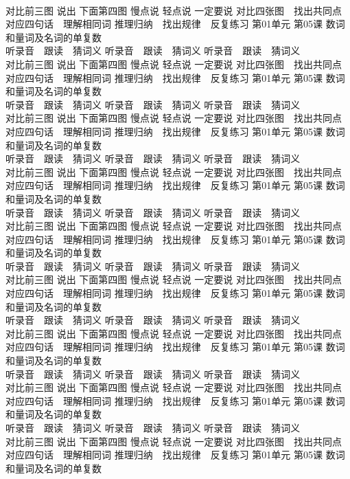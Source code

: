 \documentclass[8pt]{extreport}
\begin{document}
\begin{CJK}{UTF8}{min}
\\	对比前三图 说出 下面第四图 慢点说 轻点说 一定要说	对比四张图　找出共同点 对应四句话　理解相同词 推理归纳　找出规律　反复练习 第01单元 第05课 数词和量词及名词的单复数
\\	听录音　跟读　猜词义 听录音　跟读　猜词义 听录音　跟读　猜词义 
\\	对比前三图 说出 下面第四图 慢点说 轻点说 一定要说	对比四张图　找出共同点 对应四句话　理解相同词 推理归纳　找出规律　反复练习 第01单元 第05课 数词和量词及名词的单复数
\\	听录音　跟读　猜词义 听录音　跟读　猜词义 听录音　跟读　猜词义 
\\	对比前三图 说出 下面第四图 慢点说 轻点说 一定要说	对比四张图　找出共同点 对应四句话　理解相同词 推理归纳　找出规律　反复练习 第01单元 第05课 数词和量词及名词的单复数
\\	听录音　跟读　猜词义 听录音　跟读　猜词义 听录音　跟读　猜词义 
\\	对比前三图 说出 下面第四图 慢点说 轻点说 一定要说	对比四张图　找出共同点 对应四句话　理解相同词 推理归纳　找出规律　反复练习 第01单元 第05课 数词和量词及名词的单复数
\\	听录音　跟读　猜词义 听录音　跟读　猜词义 听录音　跟读　猜词义 
\\	对比前三图 说出 下面第四图 慢点说 轻点说 一定要说	对比四张图　找出共同点 对应四句话　理解相同词 推理归纳　找出规律　反复练习 第01单元 第05课 数词和量词及名词的单复数
\\	听录音　跟读　猜词义 听录音　跟读　猜词义 听录音　跟读　猜词义 
\\	对比前三图 说出 下面第四图 慢点说 轻点说 一定要说	对比四张图　找出共同点 对应四句话　理解相同词 推理归纳　找出规律　反复练习 第01单元 第05课 数词和量词及名词的单复数
\\	听录音　跟读　猜词义 听录音　跟读　猜词义 听录音　跟读　猜词义 
\\	对比前三图 说出 下面第四图 慢点说 轻点说 一定要说	对比四张图　找出共同点 对应四句话　理解相同词 推理归纳　找出规律　反复练习 第01单元 第05课 数词和量词及名词的单复数
\\	听录音　跟读　猜词义 听录音　跟读　猜词义 听录音　跟读　猜词义 
\\	对比前三图 说出 下面第四图 慢点说 轻点说 一定要说	对比四张图　找出共同点 对应四句话　理解相同词 推理归纳　找出规律　反复练习 第01单元 第05课 数词和量词及名词的单复数
\\	听录音　跟读　猜词义 听录音　跟读　猜词义 听录音　跟读　猜词义 
\\	对比前三图 说出 下面第四图 慢点说 轻点说 一定要说	对比四张图　找出共同点 对应四句话　理解相同词 推理归纳　找出规律　反复练习 第01单元 第05课 数词和量词及名词的单复数

\end{CJK}
\end{document}

